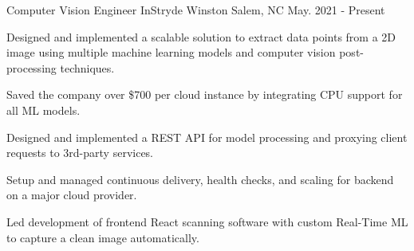 

\begin{cventries}

  \cventry
    {Computer Vision Engineer} %
    {InStryde} %
    {Winston Salem, NC} %
    {May. 2021 - Present} %
    {
      \begin{cvitems} %
        \item {Designed and implemented a scalable solution to extract data points from a 2D image using multiple machine learning models and computer vision post-processing techniques.}
        \item {Saved the company over \$700 per cloud instance by integrating CPU support for all ML models.}
        \item {Designed and implemented a REST API for model processing and proxying client requests to 3rd-party services.}
        \item {Setup and managed continuous delivery, health checks, and scaling for backend on a major cloud provider.}
        \item {Led development of frontend React scanning software with custom Real-Time ML to capture a clean image automatically.}
      \end{cvitems}
    }

\end{cventries}
